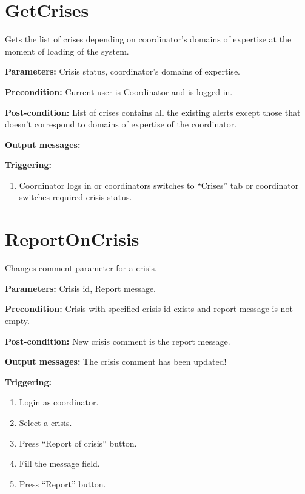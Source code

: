 \section{GetCrises}
\label{operation:GetCrises}
Gets the list of crises depending on coordinator's domains of expertise at the
moment of loading of the system.

\begin{description}

\item \textbf{Parameters:} Crisis status, coordinator's domains of
expertise.
\item \textbf{Precondition:} Current user is Coordinator and is logged in.
\item \textbf{Post-condition:} List of crises contains all the existing alerts
except those that doesn't correspond to domains of expertise of the coordinator.

\item \textbf{Output messages:} ---

\item \textbf{Triggering:}
\begin{enumerate}
\item Coordinator logs in or coordinators switches to ``Crises'' tab or
coordinator switches required crisis status.
\end{enumerate}
 
\end{description}

\section{ReportOnCrisis}
\label{operation:ReportOnCrisis}
Changes comment parameter for a crisis.

\begin{description}

\item \textbf{Parameters:} Crisis id, Report message.
\item \textbf{Precondition:} Crisis with specified crisis id exists and report
message is not empty.
\item \textbf{Post-condition:} New crisis comment is the report message.

\item \textbf{Output messages:} The crisis comment has been updated!

\item \textbf{Triggering:}
\begin{enumerate}
\item Login as coordinator.
\item Select a crisis.
\item Press ``Report of crisis'' button.
\item Fill the message field.
\item Press ``Report'' button.
\end{enumerate}
 
\end{description}

